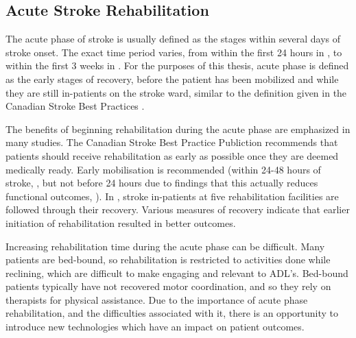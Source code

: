 \documentclass[12pt]{report}
\begin{document}
\subsection{Acute Stroke Rehabilitation}

The acute phase of stroke is usually defined as the stages within several days of stroke onset. The exact time period varies, from within the first 24 hours in \cite{Veerbeek2014}, to within the first 3 weeks in \cite{Cameirao2008}. For the purposes of this thesis, acute phase is defined as the early stages of recovery, before the patient has been mobilized and while they are still in-patients on the stroke ward, similar to the definition given in the Canadian Stroke Best Practices \cite{Casaubon2016}. 

The benefits of beginning rehabilitation during the acute phase are emphasized in many studies. The Canadian Stroke Best Practice Publiction recommends that patients should receive rehabilitation as early as possible once they are deemed medically ready. Early mobilisation is recommended (within 24-48 hours of stroke, \cite{Casaubon2016}, but not before 24 hours due to findings that this actually reduces functional outcomes, \cite{AVERTTrialCollaborationgroup2015}). In \cite{Horn2005}, stroke in-patients at five rehabilitation facilities are followed through their recovery. Various measures of recovery indicate that earlier initiation of rehabilitation resulted in better outcomes. 

Increasing rehabilitation time during the acute phase can be difficult. Many patients are bed-bound, so rehabilitation is restricted to activities done while reclining, which are difficult to make engaging and relevant to ADL's. Bed-bound patients typically have not recovered motor coordination, and so they rely on therapists for physical assistance. Due to the importance of acute phase rehabilitation, and the difficulties associated with it, there is an opportunity to introduce new technologies which have an impact on patient outcomes. 
\end{document}
